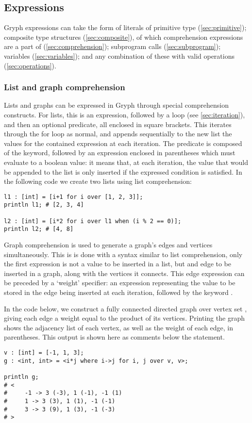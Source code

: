 \subsection{Expressions}
\label{sec:expressions}
Gryph expressions can take the form of literals of primitive type (\autoref{sec:primitive}); composite type structures (\autoref{sec:composite}), of which comprehension expressions are a part of (\autoref{sec:comprehension}); subprogram calls (\autoref{sec:subprogram}); variables (\autoref{sec:variables}); and any combination of these with valid operations (\autoref{sec:operations}).

\subsubsection{List and graph comprehension}
\label{sec:comprehension}
Lists and graphs can be expressed in Gryph through special comprehension constructs. For lists, this is an expression, followed by a  loop (see \autoref{sec:iteration}), and then an optional predicate, all enclosed in square brackets. This iterates through the for loop as normal, and appends sequentially to the new list the values for the contained expression at each iteration. The predicate is composed of the  keyword, followed by an expression enclosed in parentheses which must evaluate to a boolean value: it means that, at each iteration, the value that would be appended to the list is only inserted if the expressed condition is satisfied.
In the following code we create two lists using list comprehension:
\begin{lstlisting}[language=Gryph]
l1 : [int] = [i+1 for i over [1, 2, 3]];
println l1; # [2, 3, 4]

l2 : [int] = [i*2 for i over l1 when (i % 2 == 0)];
println l2; # [4, 8]
\end{lstlisting}

Graph comprehension is used to generate a graph's edges and vertices simultaneously. This is is done with a syntax similar to list comprehension, only the first expression is not a value to be inserted in a list, but and edge to be inserted in a graph, along with the vertices it connects. This edge expression can be preceded by a `weight' specifier: an expression representing the value to be stored in the edge being inserted at each iteration, followed by the keyword .

In the code below, we construct a fully connected directed graph over vertex set , giving each edge a weight equal to the product of its vertices. Printing the graph shows the adjacency list of each vertex, as well as the weight of each edge, in parentheses. This output is shown here as comments below the  statement.
\begin{lstlisting}[language=Gryph]
v : [int] = [-1, 1, 3];
g : <int, int> = <i*j where i->j for i, j over v, v>;

println g;
# <
#     -1 -> 3 (-3), 1 (-1), -1 (1)
#     1 -> 3 (3), 1 (1), -1 (-1)
#     3 -> 3 (9), 1 (3), -1 (-3)
# >
\end{lstlisting}

